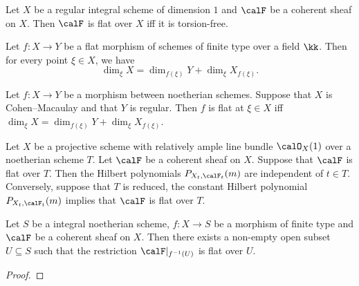     \begin{proposition}\label{prop:flat_over_curve_iff_torsion_free}
        Let \(X\) be a regular integral scheme of dimension \(1\) and \(\calF\) be a coherent sheaf on \(X\).
        Then \(\calF\) is flat over \(X\) iff it is torsion-free.
    \end{proposition}

    \begin{proposition}\label{prop:flat_and_equi_dimensional_fiber}
        Let \(f:X \to Y\) be a flat morphism of schemes of finite type over a field \(\kk\).
        Then for every point \(\xi \in X\), we have
        \[ \dim_\xi X = \dim_{f(\xi)} Y + \dim_\xi X_{f(\xi)}. \]
    \end{proposition}

    \begin{theorem}\label{thm:Miracle_flatness}
        Let \(f:X\to Y\) be a morphism between noetherian schemes.
        Suppose that \(X\) is Cohen--Macaulay and that \(Y\) is regular.
        Then \(f\) is flat at \(\xi \in X\) iff \(\dim_\xi X = \dim_{f(\xi)} Y + \dim_\xi X_{f(\xi)}\).
    \end{theorem}

    \begin{theorem}\label{thm:flat_iff_has_the_same_Hilbert_polynomials}
        Let \(X\) be a projective scheme with relatively ample line bundle \(\calO_X(1)\) over a noetherian scheme \(T\).
        Let \(\calF\) be a coherent sheaf on \(X\).
        Suppose that \(\calF\) is flat over \(T\).
        Then the Hilbert polynomials \(P_{X_t,\calF_t}(m)\) are independent of \(t \in T\).
        Conversely, suppose that \(T\) is reduced, the constant Hilbert polynomial \(P_{X_t,\calF_t}(m)\) implies that \(\calF\) is flat over \(T\).
    \end{theorem}

    \begin{theorem}\label{thm:generic_flatness}
        Let \(S\) be a integral noetherian scheme, \(f:X\to S\) be a morphism of finite type and \(\calF\) be a coherent sheaf on \(X\).
        Then there exists a non-empty open subset \(U \subseteq S\) such that the restriction \(\calF|_{f^{-1}(U)}\) is flat over \(U\).
    \end{theorem}
    \begin{proof}
    \end{proof}

